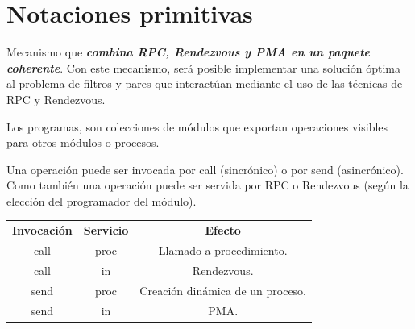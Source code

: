\documentclass[a4paper, 10pt]{report}
\begin{document}
\section{Notaciones primitivas}

Mecanismo que \textbf{\emph{combina RPC, Rendezvous y PMA en un paquete coherente}}. Con este mecanismo, será posible implementar una solución óptima al problema de filtros y pares que interactúan mediante el uso de las técnicas de RPC y Rendezvous.

Los programas, son colecciones de módulos que exportan operaciones visibles para otros módulos o procesos.

Una operación puede ser invocada por call (sincrónico) o por send (asincrónico). Como también una operación puede ser servida por RPC o Rendezvous (según la elección del programador del módulo).

{\renewcommand{\arraystretch}{2}%
\begin{center}
    \begin{tabular}{c c c}
    \textbf{Invocación} &  \textbf{Servicio} & \textbf{Efecto} \\
    call & proc & Llamado a procedimiento. \\
    \hline
    call & in & Rendezvous. \\
    \hline
    send & proc & Creación dinámica de un proceso. \\
    \hline
    send & in & PMA. \\
\end{tabular}
\end{center}}
\end{document}
